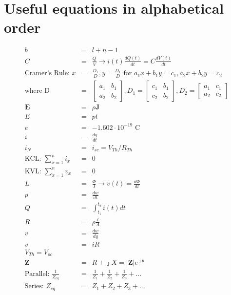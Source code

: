 \documentclass[11pt]{book}
\begin{document}
\section{Useful equations in alphabetical order}
\begin{eqnarray*}
	b &=& l+n-1 \\
	C &=& \frac{Q}{V} \rightarrow i(t) \frac{dQ(t)}{dt} = C\frac{dV(t)}{dt}\\
	\text{Cramer's Rule: } x &=& \frac{D_1}{D}, y = \frac{D_1}{D}\text{ for }a_1x+b_1y=c_1, a_2x+b_2y=c_2\\
	\text{where D } &=& \begin{bmatrix}
		a_1 & b_1 \\ a_2 & b_2
	\end{bmatrix}, D_1 = \begin{bmatrix}
		c_1 & b_1 \\ c_2 & b_2
	\end{bmatrix}, D_2 = \begin{bmatrix}
		a_1 & c_1 \\ a_2 & c_2
	\end{bmatrix}  \\
	\mathbf{E} &=& \rho \mathbf{J} \\
	E &=& pt \\
	e &=& -1.602\cdot10^{-19}\text{ C} \\
	i &=& \frac{dq}{dt} \\
	i_{N} &=& i_{sc} = V_{Th}/R_{Th} \\
	\text{KCL: } \sum_{x=1}^{n}i_x &=& 0 \\
	\text{KVL: } \sum_{x=1}^{n}v_x &=& 0 \\
	L &=& \frac{\Phi}{I} \rightarrow v(t) = \frac{d\Phi}{dt} \\
	p &=& \frac{dw}{dt} \\
	Q &=& \int_{t_1}^{t_2}i(t)dt \\
	R &=& \rho \frac{l}{A} \\
	v &=& \frac{dw}{dq} \\
	v &=& iR \\
	V_{Th} = V_{oc} \\
	\mathbf{Z}&=& R + \jmath X = \vert \mathbf{Z} \vert e^{\jmath \theta} \\
	\text{Parallel: } \frac{1}{Z_{eq}} &=& \frac{1}{Z_{1}} + \frac{1}{Z_{2}} + \frac{1}{Z_{3}} + ...\\
	\text{Series: } Z_{eq} &=& Z_1 + Z_2 + Z_3 + ...
\end{eqnarray*}
\end{document}
